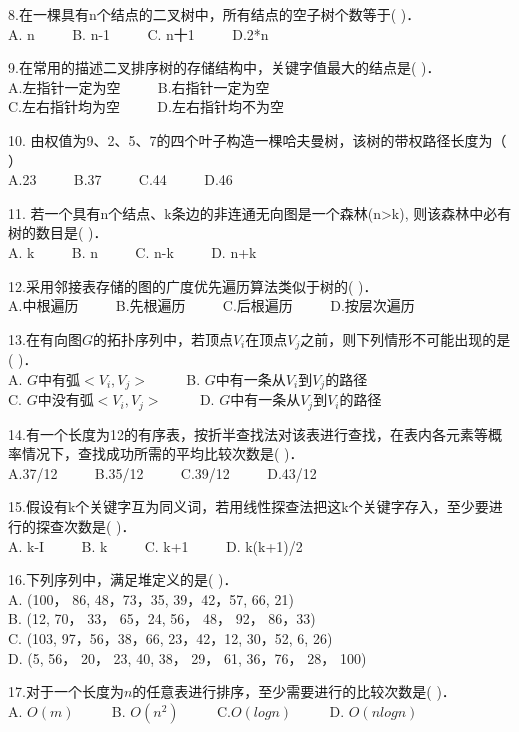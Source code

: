 8.在一棵具有n个结点的二叉树中，所有结点的空子树个数等于(    )． \\
A. n $\qquad$ B. n-1 $\qquad$ C. n十1 $\qquad$ D.2*n

9.在常用的描述二叉排序树的存储结构中，关键字值最大的结点是(    )． \\
A.左指针一定为空 $\qquad$ B.右指针一定为空 \\
C.左右指针均为空 $\qquad$ D.左右指针均不为空

10. 由权值为9、2、5、7的四个叶子构造一棵哈夫曼树，该树的带权路径长度为（    ） \\
A.23 $\qquad$ B.37 $\qquad$ C.44 $\qquad$ D.46

11. 若一个具有n个结点、k条边的非连通无向图是一个森林(n>k), 则该森林中必有树的数目是(    )． \\
A. k $\qquad$ B. n $\qquad$ C. n-k $\qquad$ D. n+k

12.采用邻接表存储的图的广度优先遍历算法类似于树的(    )． \\
A.中根遍历 $\qquad$ B.先根遍历 $\qquad$ C.后根遍历 $\qquad$ D.按层次遍历

13.在有向图$G$的拓扑序列中，若顶点$V_i$在顶点$V_j$之前，则下列情形不可能出现的是(    )． \\
A. $G$中有弧$<V_i,V_j>$ $\qquad$ B. $G$中有一条从$V_i$到$V_j$的路径 \\
C. $G$中没有弧$<V_i,V_j>$ $\qquad$ D. $G$中有一条从$V_j$到$V_i$的路径

14.有一个长度为12的有序表，按折半查找法对该表进行查找，在表内各元素等概率情况下，查找成功所需的平均比较次数是(    )． \\
A.37/12 $\qquad$ B.35/12 $\qquad$ C.39/12 $\qquad$ D.43/12

15.假设有k个关键字互为同义词，若用线性探查法把这k个关键字存入，至少要进行的探查次数是(    )． \\
A. k-I $\qquad$ B. k $\qquad$ C. k+1 $\qquad$ D. k(k+1)/2

16.下列序列中，满足堆定义的是(    )． \\
A. (100， 86, 48，73，35, 39，42，57, 66, 21) \\
B. (12, 70， 33， 65，24, 56， 48， 92， 86，33) \\
C. (103, 97，56，38，66, 23，42，12, 30，52, 6, 26) \\
D. (5, 56， 20， 23, 40, 38， 29， 61, 36，76， 28， 100)

17.对于一个长度为$n$的任意表进行排序，至少需要进行的比较次数是( )． \\
A. $O(m)$ $\qquad$ B. $O(n^2)$ $\qquad$ C.$O(logn)$ $\qquad$ D. $O(nlogn)$

